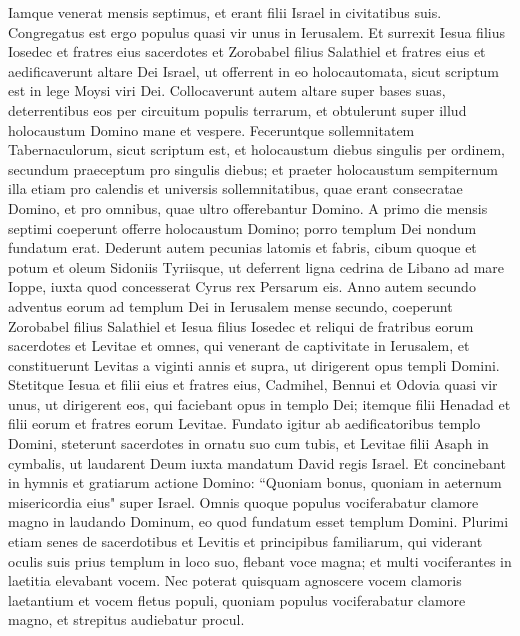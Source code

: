 \begin{biblechapter}  
\verse Iamque venerat mensis septimus, et erant filii Israel in civitatibus suis. Congregatus est ergo populus quasi vir unus in Ierusalem. 
\verse Et surrexit Iesua filius Iosedec et fratres eius sacerdotes et Zorobabel filius Salathiel et fratres eius et aedificaverunt altare Dei Israel, ut offerrent in eo holocautomata, sicut scriptum est in lege Moysi viri Dei. 
\verse Collocaverunt autem altare super bases suas, deterrentibus eos per circuitum populis terrarum, et obtulerunt super illud holocaustum Domino mane et vespere. 
\verse Feceruntque sollemnitatem Tabernaculorum, sicut scriptum est, et holocaustum diebus singulis per ordinem, secundum praeceptum pro singulis diebus; 
\verse et praeter holocaustum sempiternum illa etiam pro calendis et universis sollemnitatibus, quae erant consecratae Domino, et pro omnibus, quae ultro offerebantur Domino.  
\verse A primo die mensis septimi coeperunt offerre holocaustum Domino; porro templum Dei nondum fundatum erat. 
\verse Dederunt autem pecunias latomis et fabris, cibum quoque et potum et oleum Sidoniis Tyriisque, ut deferrent ligna cedrina de Libano ad mare Ioppe, iuxta quod concesserat Cyrus rex Persarum eis. 
\verse Anno autem secundo adventus eorum ad templum Dei in Ierusalem mense secundo, coeperunt Zorobabel filius Salathiel et Iesua filius Iosedec et reliqui de fratribus eorum sacerdotes et Levitae et omnes, qui venerant de captivitate in Ierusalem, et constituerunt Levitas a viginti annis et supra, ut dirigerent opus templi Domini. 
\verse Stetitque Iesua et filii eius et fratres eius, Cadmihel, Bennui et Odovia quasi vir unus, ut dirigerent eos, qui faciebant opus in templo Dei; itemque filii Henadad et filii eorum et fratres eorum Levitae. 
\verse Fundato igitur ab aedificatoribus templo Domini, steterunt sacerdotes in ornatu suo cum tubis, et Levitae filii Asaph in cymbalis, ut laudarent Deum iuxta mandatum David regis Israel. 
\verse Et concinebant in hymnis et gratiarum actione Domino: “Quoniam bonus, quoniam in aeternum misericordia eius" super Israel. Omnis quoque populus vociferabatur clamore magno in laudando Dominum, eo quod fundatum esset templum Domini. 
\verse Plurimi etiam senes de sacerdotibus et Levitis et principibus familiarum, qui viderant oculis suis prius templum in loco suo, flebant voce magna; et multi vociferantes in laetitia elevabant vocem.  
\verse Nec poterat quisquam agnoscere vocem clamoris laetantium et vocem fletus populi, quoniam populus vociferabatur clamore magno, et strepitus audiebatur procul. 
\end{biblechapter}

